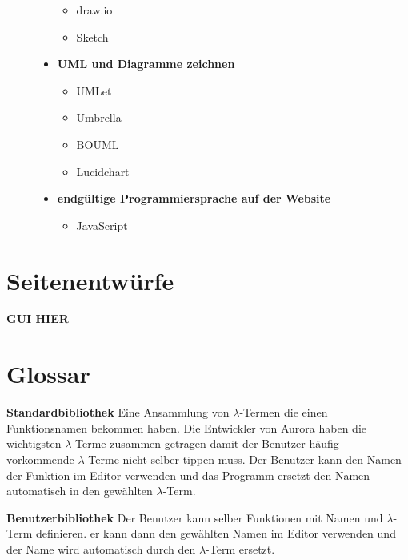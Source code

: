 \documentclass[parskip=full,11pt,twoside]{scrartcl}
\begin{document}
\begin{description}
\begin{itemize}
			\begin{itemize}
				\item draw.io
				\item Sketch
			\end{itemize}
		\item \textbf{UML und Diagramme zeichnen}
			\begin{itemize}
				\item UMLet
				\item Umbrella
				\item BOUML
				\item Lucidchart
			\end{itemize}
		\item \textbf{endgültige Programmiersprache auf der Website}
			\begin{itemize}
				\item JavaScript
			\end{itemize}
	\end{itemize}
\newpage
\appendix
\end{description}
\section{Seitenentwürfe}
\textbf{GUI HIER}


\newpage
\section{Glossar}

\textbf{Standardbibliothek}
\newline
Eine Ansammlung von $\lambda$-Termen die einen Funktionsnamen bekommen haben. Die Entwickler von Aurora haben die wichtigsten $\lambda$-Terme zusammen getragen damit der Benutzer häufig vorkommende $\lambda$-Terme nicht selber tippen muss. Der Benutzer kann den Namen der Funktion im Editor verwenden und das Programm ersetzt den Namen automatisch in den gewählten $\lambda$-Term.

\textbf{Benutzerbibliothek}
\newline
Der Benutzer kann selber Funktionen mit Namen und $\lambda$-Term definieren. er kann dann den gewählten Namen im Editor verwenden und der Name wird automatisch durch den $\lambda$-Term ersetzt.
\end{document}
